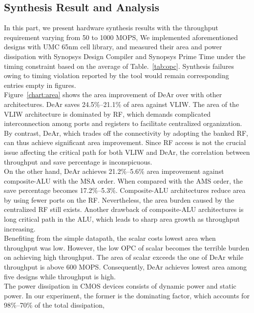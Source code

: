 \subsection{Synthesis Result and Analysis}
In this part, we present hardware synthesis results with the throughput requirement varying from 50 to 1000 MOPS, 
We implemented aforementioned designs with UMC 65nm cell library, 
and measured their area and power dissipation with Synopsys Design Compiler and Synopsys Prime Time under the timing constraint based on the average of Table.~\ref{tab:opc}.
Synthesis failures owing to timing violation reported by the tool would remain corresponding entries empty in figures.
\\\indent 
Figure~\ref{chart:area} shows the area improvement of DeAr over with other architectures.
DeAr saves 24.5\%--21.1\% of area against VLIW.
The area of the VLIW architecture is dominated by RF, 
which demands complicated interconnection among ports and registers to facilitate centralized organization.
By contrast, DeAr, which trades off the connectivity by adopting the banked RF, can thus achieve significant area improvement.
Since RF access is not the crucial issue affecting the critical path for both VLIW and DeAr, 
the correlation between throughput and save percentage is inconspicuous.
\\\indent On the other hand, DeAr achieves 21.2\%--5.6\% area improvement against composite-ALU with the MSA order.
When compared with the AMS order, the save percentage becomes 17.2\%--5.3\%.
Composite-ALU architectures reduce area by using fewer ports on the RF.
Nevertheless, the area burden caused by the centralized RF still exists.
Another drawback of composite-ALU architectures is long critical path in the ALU, 
which leads to sharp area growth as throughput increasing.
\\\indent Benefiting from the simple datapath, 
the scalar costs lowest area when throughput was low.
However, the low OPC of scalar becomes the terrible burden on achieving high throughput.
The area of scalar exceeds the one of DeAr while throughput is above 600 MOPS.
Consequently, DeAr achieves lowest area among five designs while throughput is high.%
\\\indent
The power dissipation in CMOS devices consists of dynamic power and static power.
In our experiment, the former is the dominating factor, which accounts for 98\%--70\% of the total dissipation, 
